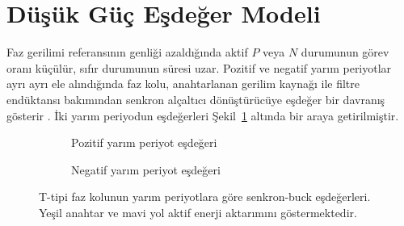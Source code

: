\section{Düşük Güç Eşdeğer Modeli}
\label{sec:dusuk-guc-esdeger}

Faz gerilimi referansının genliği azaldığında aktif $P$ veya $N$ durumunun görev oranı küçülür, sıfır durumunun süresi uzar. Pozitif ve negatif yarım periyotlar ayrı ayrı ele alındığında faz kolu, anahtarlanan gerilim kaynağı ile filtre endüktansı bakımından senkron alçaltıcı dönüştürücüye eşdeğer bir davranış gösterir \citep{Mohan2003,Erickson2001}. İki yarım periyodun eşdeğerleri Şekil~\ref{fig:senkron-buck-esdeger} altında bir araya getirilmiştir.

\begin{figure}[htbp]
  \centering
  \begin{subfigure}[t]{0.46\textwidth}
    \centering
    \caption{Pozitif yarım periyot eşdeğeri}
  \end{subfigure}\hfill
  \begin{subfigure}[t]{0.46\textwidth}
    \centering
    \caption{Negatif yarım periyot eşdeğeri}
  \end{subfigure}
  \caption{T-tipi faz kolunun yarım periyotlara göre senkron-buck eşdeğerleri. Yeşil anahtar ve mavi yol aktif enerji aktarımını göstermektedir.}
  \label{fig:senkron-buck-esdeger}
\end{figure}

